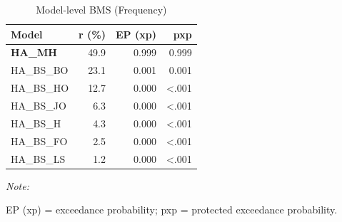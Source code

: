 \begin{table}[!h]
\centering
\caption{Model-level BMS (Frequency)}
\centering
\begin{threeparttable}
\begin{tabular}[t]{lrrr}
\toprule
Model & r (\%) & EP (xp) & pxp\\
\midrule
\textbf{HA_MH} & 49.9 & 0.999 & 0.999\\
HA_BS_BO & 23.1 & 0.001 & 0.001\\
HA_BS_HO & 12.7 & 0.000 & <.001\\
HA_BS_JO & 6.3 & 0.000 & <.001\\
HA_BS_H & 4.3 & 0.000 & <.001\\
HA_BS_FO & 2.5 & 0.000 & <.001\\
HA_BS_LS & 1.2 & 0.000 & <.001\\
\bottomrule
\end{tabular}
\begin{tablenotes}
\item \textit{Note: } 
\item EP (xp) = exceedance probability; pxp = protected exceedance probability.
\end{tablenotes}
\end{threeparttable}
\end{table}
